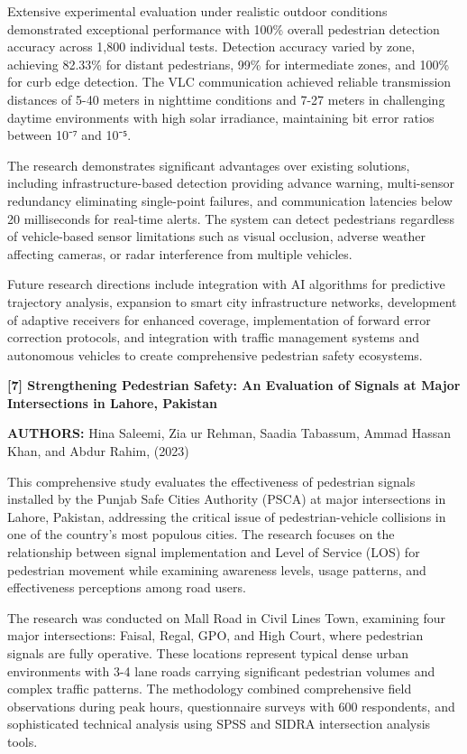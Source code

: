 \documentclass[a4paper, 12pt]{report}
\begin{document}
Extensive experimental evaluation under realistic outdoor conditions demonstrated exceptional performance with 100\% overall pedestrian detection accuracy across 1,800 individual tests. Detection accuracy varied by zone, achieving 82.33\% for distant pedestrians, 99\% for intermediate zones, and 100\% for curb edge detection. The VLC communication achieved reliable transmission distances of 5-40 meters in nighttime conditions and 7-27 meters in challenging daytime environments with high solar irradiance, maintaining bit error ratios between 10⁻⁷ and 10⁻⁵.

The research demonstrates significant advantages over existing solutions, including infrastructure-based detection providing advance warning, multi-sensor redundancy eliminating single-point failures, and communication latencies below 20 milliseconds for real-time alerts. The system can detect pedestrians regardless of vehicle-based sensor limitations such as visual occlusion, adverse weather affecting cameras, or radar interference from multiple vehicles.

Future research directions include integration with AI algorithms for predictive trajectory analysis, expansion to smart city infrastructure networks, development of adaptive receivers for enhanced coverage, implementation of forward error correction protocols, and integration with traffic management systems and autonomous vehicles to create comprehensive pedestrian safety ecosystems.

\noindent \textbf{[7] Strengthening Pedestrian Safety: An Evaluation of Signals at Major Intersections in Lahore, Pakistan}

\textbf{AUTHORS:} Hina Saleemi, Zia ur Rehman, Saadia Tabassum, Ammad Hassan Khan, and Abdur Rahim, (2023)



This comprehensive study evaluates the effectiveness of pedestrian signals installed by the Punjab Safe Cities Authority (PSCA) at major intersections in Lahore, Pakistan, addressing the critical issue of pedestrian-vehicle collisions in one of the country's most populous cities. The research focuses on the relationship between signal implementation and Level of Service (LOS) for pedestrian movement while examining awareness levels, usage patterns, and effectiveness perceptions among road users.

The research was conducted on Mall Road in Civil Lines Town, examining four major intersections: Faisal, Regal, GPO, and High Court, where pedestrian signals are fully operative. These locations represent typical dense urban environments with 3-4 lane roads carrying significant pedestrian volumes and complex traffic patterns. The methodology combined comprehensive field observations during peak hours, questionnaire surveys with 600 respondents, and sophisticated technical analysis using SPSS and SIDRA intersection analysis tools.
\end{document}
